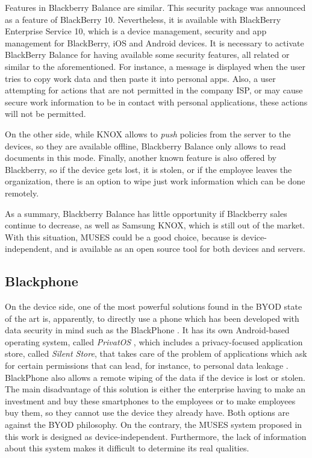 Features in Blackberry Balance are similar. This security package was announced as a feature of BlackBerry 10. Nevertheless, it is available with BlackBerry Enterprise Service 10, which is a device management, security and app management for BlackBerry, iOS and Android devices. It is necessary to activate BlackBerry Balance for having available some security features, all related or similar to the aforementioned. For instance, a message is displayed when the user tries to copy work data and then paste it into personal apps. Also, a user attempting for actions that are not permitted in the company ISP, or may cause secure work information to be in contact with personal applications, these actions will not be permitted. 

On the other side, while KNOX allows to \textit{push} policies from the server to the devices, so they are available offline, Blackberry Balance only allows to read documents in this mode. Finally, another known feature is also offered by Blackberry, so if the device gets lost, it is stolen, or if the employee leaves the organization, there is an option to wipe just work information which can be done remotely.

As a summary, Blackberry Balance has little opportunity if Blackberry sales continue to decrease, as well as Samsung KNOX, which is still out of the market. With this situation, MUSES could be a good choice, because is device-independent, and is available as an open source tool for both devices and servers.


\subsection{Blackphone}
\label{subsec:blackphone}

On the device side, one of the most powerful solutions found in the BYOD state of the art is, apparently, to directly use a phone which has been developed with data security in mind such as the BlackPhone \cite{Blackphone}. It has its own Android-based operating system, called \textit{PrivatOS} \cite{Blackphone}, which includes a privacy-focused application store, called \textit{Silent Store}, that takes care of the problem of applications which ask for certain permissions that can lead, for instance, to personal data leakage \cite{gangula2013survey}. BlackPhone also allows a remote wiping of the data if the device is lost or stolen. The main disadvantage of this solution is either the enterprise having to make an investment and buy these smartphones to the employees or to make employees buy them, so they cannot use the device they already have. Both options are against the BYOD philosophy. On the contrary, the MUSES system proposed in this work is designed as device-independent.
Furthermore, the lack of information about this system makes it difficult to determine its real qualities.

